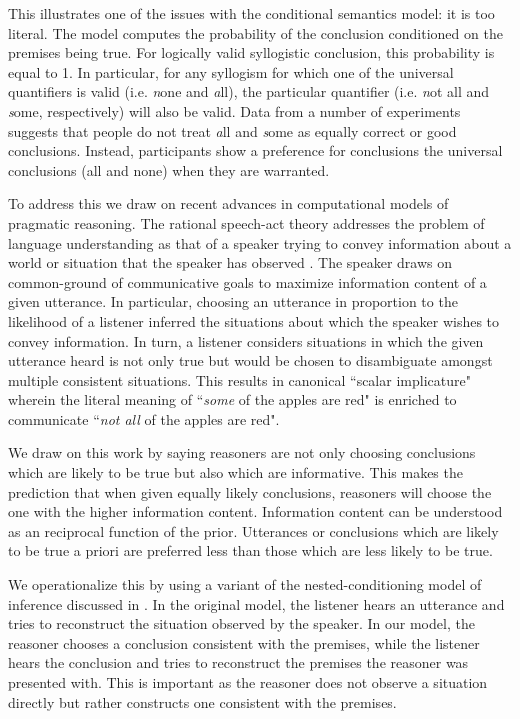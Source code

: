 \documentclass[10pt,letterpaper]{article}
\begin{document}
This illustrates one of the issues with the conditional semantics model: it is too literal. The model computes the probability of the conclusion conditioned on the premises being true. For logically valid syllogistic conclusion, this probability is equal to 1. In particular, for any syllogism for which one of the universal quantifiers is valid (i.e. {\emph none} and {\emph all}), the particular quantifier (i.e. {\emph not all} and {\emph some}, respectively) will also be valid. Data from a number of experiments suggests that people do not treat {\emph all} and {\emph some} as equally correct or good conclusions. Instead, participants show a preference for conclusions the universal conclusions (all and none) when they are warranted. 

To address this we draw on recent advances in computational models of pragmatic reasoning. The rational speech-act theory addresses the problem of language understanding as that of a speaker trying to convey information about a world or situation that the speaker has observed \cite{Frank2012a}. The speaker draws on common-ground of communicative goals to maximize information content of a given utterance. In particular, choosing an utterance in proportion to the likelihood of a listener inferred the situations about which the speaker wishes to convey information. In turn, a listener considers situations in which the given utterance heard is not only true but would be chosen to disambiguate amongst multiple consistent situations. This results in canonical ``scalar implicature" wherein the literal meaning of ``{\em some} of the apples are red" is enriched to communicate ``{\em not all} of the apples are red".

We draw on this work by saying reasoners are not only choosing conclusions which are likely to be true but also which are informative. This makes the prediction that when given equally likely conclusions, reasoners will choose the one with the higher information content. Information content can be understood as an reciprocal function of the prior. Utterances or conclusions which are likely to be true a priori are preferred less than those which are less likely to be true. 

We operationalize this by using a variant of the nested-conditioning model of inference discussed in \cite{Goodman2013}. In the original model, the listener hears an utterance and tries to reconstruct the situation observed by the speaker. In our model, the reasoner chooses a conclusion consistent with the premises, while the listener hears the conclusion and tries to reconstruct the premises the reasoner was presented with. This is important as the reasoner does not observe a situation directly but rather constructs one consistent with the premises. 
\end{document}
